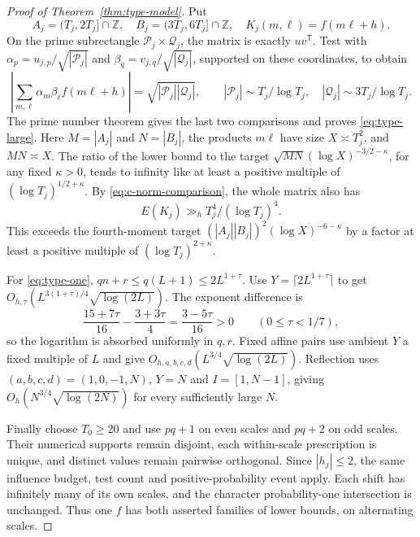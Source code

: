 \documentclass[11pt]{article}
\theoremstyle{definition}
\newcommand{\Z}{\mathbb Z}
\theoremstyle{remark}
\numberwithin{equation}{section}
\begin{document}
\begin{proof}[Proof of Theorem~\ref{thm:type-model}]
Put
\begin{equation}\label{eq:c-rectangles}
 A_j=(T_j,2T_j]\cap\Z,\quad B_j=(3T_j,6T_j]\cap\Z,\quad K_j(m,\ell)=f(m\ell+h).
\end{equation}
On the prime subrectangle $\mathcal P_j\times\mathcal Q_j$, the matrix is exactly $uv^{\mathsf T}$.
Test with $\alpha_p=u_{j,p}/\sqrt{|\mathcal P_j|}$ and
$\beta_q=v_{j,q}/\sqrt{|\mathcal Q_j|}$, supported on these coordinates, to obtain
\begin{equation}\label{eq:c-rank-one}
 \left|\sum_{m,\ell}\alpha_m\beta_\ell f(m\ell+h)\right|
 =\sqrt{|\mathcal P_j||\mathcal Q_j|},\qquad
 |\mathcal P_j|\sim T_j/\log T_j,\quad |\mathcal Q_j|\sim3T_j/\log T_j.
\end{equation}
The prime number theorem gives the last two comparisons and proves \eqref{eq:type-large}.
Here $M=|A_j|$ and $N=|B_j|$, the products $m\ell$ have size $X\asymp T_j^2$, and $MN\asymp X$.
The ratio of the lower bound to the target $\sqrt{MN}(\log X)^{-3/2-\kappa}$, for any fixed $\kappa>0$,
tends to infinity like at least a positive multiple of
$(\log T_j)^{1/2+\kappa}$. By \eqref{eq:c-norm-comparison}, the whole matrix also has
\begin{equation}\label{eq:c-box-lower}
 E(K_j)\gg_h T_j^4/(\log T_j)^4.
\end{equation}
This exceeds the fourth-moment target $(|A_j||B_j|)^2(\log X)^{-6-\kappa}$ by a factor at least a positive
multiple of $(\log T_j)^{2+\kappa}$.

For \eqref{eq:type-one}, $qn+r\le q(L+1)\le2L^{1+\tau}$.
Use $Y=\lceil2L^{1+\tau}\rceil$ to get
$O_{h,\tau}(L^{3(1+\tau)/4}\sqrt{\log(2L)})$. The exponent difference is
\begin{equation}\label{eq:c-type-one-exponents}
 \frac{15+7\tau}{16}-\frac{3+3\tau}{4}=\frac{3-5\tau}{16}>0\qquad(0\le\tau<1/7),
\end{equation}
so the logarithm is absorbed uniformly in $q,r$.
Fixed affine pairs use ambient $Y$ a fixed multiple of $L$ and give
$O_{h,a,b,c,d}(L^{3/4}\sqrt{\log(2L)})$.
Reflection uses $(a,b,c,d)=(1,0,-1,N)$, $Y=N$ and $I=[1,N-1]$, giving
$O_h(N^{3/4}\sqrt{\log(2N)})$ for every sufficiently large $N$.

Finally choose $T_0\ge20$ and use $pq+1$ on even scales and $pq+2$ on odd scales.
Their numerical supports remain disjoint, each within-scale prescription is unique, and distinct
values remain pairwise orthogonal. Since $|h_j|\le2$, the same influence budget, test count and
positive-probability event apply. Each shift has infinitely many of its own scales, and the character
probability-one intersection is unchanged. Thus one $f$ has both asserted families of lower bounds,
on alternating scales.
\end{proof}
\end{document}
